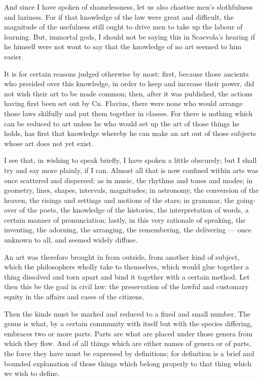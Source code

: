  And since I have spoken of shamelessness, let us also chastise men's slothfulness and laziness. For if that knowledge of the law were great and difficult, the magnitude of the usefulness still ought to drive men to take up the labour of learning. But, immortal gods, I should not be saying this in Scaevola's hearing if he himself were not wont to say that the knowledge of no art seemed to him easier.

 It is for certain reasons judged otherwise by most: first, because those ancients who presided over this knowledge, in order to keep and increase their power, did not wish their art to be made common; then, after it was published, the actions having first been set out by Cn. Flavius, there were none who would arrange those laws skilfully and put them together in classes. For there is nothing which can be reduced to art unless he who would set up the art of those things he holds, has first that knowledge whereby he can make an art out of those subjects whose art does not yet exist.

 I see that, in wishing to speak briefly, I have spoken a little obscurely; but I shall try and say more plainly, if I can. Almost all that is now confined within arts was once scattered and dispersed: as in music, the rhythms and tones and modes; in geometry, lines, shapes, intervals, magnitudes; in astronomy, the conversion of the heaven, the risings and settings and motions of the stars; in grammar, the going-over of the poets, the knowledge of the histories, the interpretation of words, a certain manner of pronunciation; lastly, in this very rationale of speaking, the inventing, the adorning, the arranging, the remembering, the delivering — once unknown to all, and seemed widely diffuse.

 An art was therefore brought in from outside, from another kind of subject, which the philosophers wholly take to themselves, which would glue together a thing dissolved and torn apart and bind it together with a certain method. Let then this be the goal in civil law: the preservation of the lawful and customary equity in the affairs and cases of the citizens.

 Then the kinds must be marked and reduced to a fixed and small number. The genus is what, by a certain community with itself but with the species differing, embraces two or more parts. Parts are what are placed under those genera from which they flow. And of all things which are either names of genera or of parts, the force they have must be expressed by definitions; for definition is a brief and bounded explanation of those things which belong properly to that thing which we wish to define.

